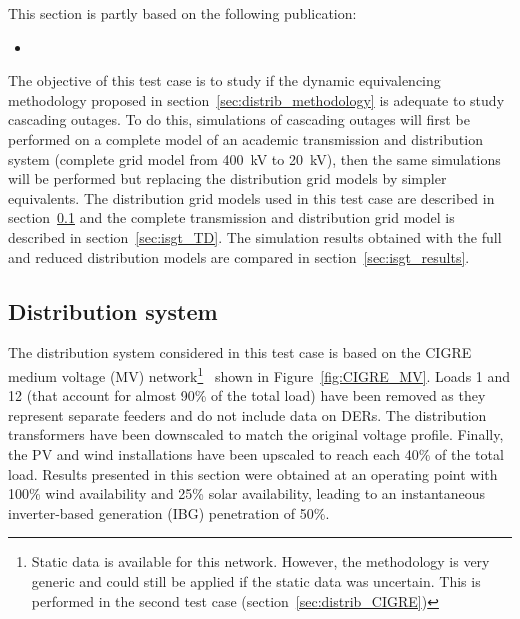 \begin{tcolorbox}[width=\linewidth, sharp corners=all,
    colback=white!80!black,
    colframe=white!80!black]
This section is partly based on the following publication:
\begin{itemize}
    \item {}
\end{itemize}
\end{tcolorbox}


The objective of this test case is to study if the dynamic equivalencing methodology proposed in section~\ref{sec:distrib_methodology} is adequate to study cascading outages. To do this, simulations of cascading outages will first be performed on a complete model of an academic transmission and distribution system (\ie complete grid model from 400~kV to 20~kV), then the same simulations will be performed but replacing the distribution grid models by simpler equivalents. The distribution grid models used in this test case are described in section~\ref{sec:isgt_distrib} and the complete transmission and distribution grid model is described in section~\ref{sec:isgt_TD}. The simulation results obtained with the full and reduced distribution models are compared in section~\ref{sec:isgt_results}.

\subsection{Distribution system}
\label{sec:isgt_distrib}

The distribution system considered in this test case is based on the CIGRE medium voltage (MV) network\footnote{Static data is available for this network. However, the methodology is very generic and could still be applied if the static data was uncertain. This is performed in the second test case (section~\ref{sec:distrib_CIGRE})}~\cite{CIGREMV} shown in Figure~\ref{fig:CIGRE_MV}. Loads 1 and 12 (that account for almost 90\% of the total load) have been removed as they represent separate feeders and do not include data on DERs. The distribution transformers have been downscaled to match the original voltage profile. Finally, the PV and wind installations have been upscaled to reach each 40\% of the total load. Results presented in this section were obtained at an operating point with 100\% wind availability and 25\% solar availability, leading to an instantaneous inverter-based generation (IBG) penetration of 50\%.


